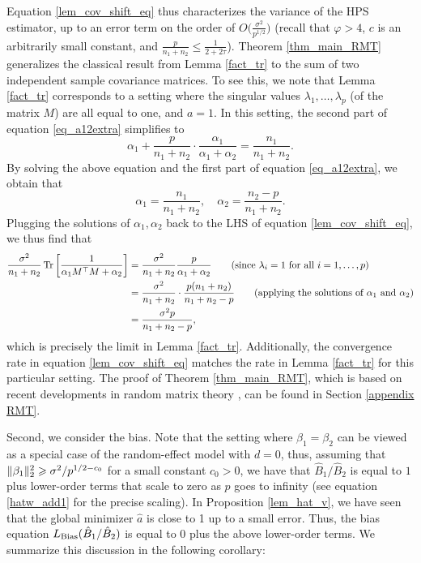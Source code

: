 Equation \eqref{lem_cov_shift_eq} thus characterizes the variance of the HPS estimator, up to an error term on the order of $O\big(\frac{\sigma^2}{p^{1/2}}\big)$ (recall that $\varphi > 4$, $c$ is an arbitrarily small constant, and $\frac{p}{n_1+n_2} \le \frac 1 {2 + 2\tau}$).
Theorem \ref{thm_main_RMT} generalizes the classical result from Lemma \ref{fact_tr} to the sum of two independent sample covariance matrices.
To see this, we note that Lemma \ref{fact_tr} corresponds to a setting where the singular values $\lambda_1,\dots,\lambda_p$ (of the matrix $M$) are all equal to one, and $a = 1$.
In this setting, the second part of equation \eqref{eq_a12extra} simplifies to
\[ \alpha_1 + \frac{p}{n_1 + n_2}\cdot \frac{\alpha_1}{\alpha_1 + \alpha_2} = \frac{n_1}{n_1 + n_2}. \]
By solving the above equation and the first part of equation \eqref{eq_a12extra}, we obtain that
$$\alpha_1 = \frac{n_1}{n_1+n_2},\quad \alpha_2 = \frac{n_2-p}{n_1+ n_2}.$$
Plugging the solutions of $\alpha_1, \alpha_2$ back to the LHS of equation \eqref{lem_cov_shift_eq}, we thus find that
\begin{align}
    \frac{\sigma^2}{n_1 + n_2} \bigtr{\frac 1 {\alpha_1 M^{\top} M + \alpha_2}} &= \frac{\sigma^2}{n_1 + n_2} \frac{p}{\alpha_1 + \alpha_2} \tag{since $\lambda_i = 1$ for all $i=1,\dots,p$} \nonumber \\
    &= \frac{\sigma^2}{n_1 + n_2} \cdot\frac{p (n_1 + n_2)}{n_1 + n_2 - p} \tag{applying the solutions of $\alpha_1$ and $\alpha_2$} \nonumber \\
    &= \frac{\sigma^2 p}{n_1 + n_2 - p}, \label{g_id}
\end{align}
which is precisely the limit in Lemma \ref{fact_tr}.
Additionally, the convergence rate in equation \eqref{lem_cov_shift_eq} matches the rate in Lemma \ref{fact_tr} for this particular setting.
The proof of Theorem \ref{thm_main_RMT}, which is based on recent developments in random matrix theory \cite{Anisotropic}, can be found in Section \ref{appendix RMT}.

Second, we consider the bias.
Note that the setting where $\beta_1 = \beta_2$ can be viewed as a special case of the random-effect model with $d = 0$, thus, assuming that $\|\beta_1\|_2^2 \geqslant \sigma^2 / p^{1/2 - c_0}$ for a small constant $c_0 > 0$, we have that $\hat B_1 / \hat B_2$ is equal to $1$ plus lower-order terms that scale to zero as $p$ goes to infinity (see equation \eqref{hatw_add1} for the precise scaling).
In Proposition \ref{lem_hat_v}, we have seen that the global minimizer $\hat a$ is close to 1 up to a small error.
Thus, the bias equation $L_{\textup{Bias}}(\hat B_1 / \hat B_2)$ is equal to $0$ plus the above lower-order terms.
We summarize this discussion in the following corollary:

